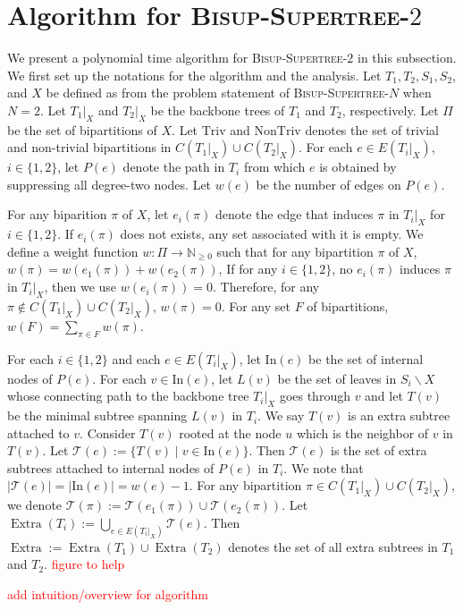 \documentclass{bmcart}
\newcommand{\note}[1]{\textcolor{red}{#1}}
\newcommand{\In}{\mathrm{In}}
\newcommand{\triv}{\mathrm{Triv}}
\newcommand{\ntriv}{\mathrm{NonTriv}}
\newcommand{\bisuptwo}{\textsc{Bisup-Supertree-$2$}\xspace}
\newcommand{\bisupn}{\textsc{Bisup-Supertree-$N$}\xspace}
\DeclareMathOperator*{\extra}{Extra}
\begin{document}
\section{Algorithm for \bisuptwo}
We present a polynomial time algorithm for \bisuptwo in this subsection. We first set up the notations for the algorithm and the analysis. Let $T_1,T_2,S_1,S_2$, and $X$ be defined as from the problem statement of \bisupn when $N = 2$. Let $T_1|_X$ and $T_2|_X$ be the backbone trees of $T_1$ and $T_2$, respectively. Let $\Pi$ be the set of bipartitions of $X$. Let $\triv$ and $\ntriv$ denotes the set of trivial and non-trivial bipartitions in $C(T_1|_X) \cup C(T_2|_X)$. For each $e \in E(T_i|_X)$, $i \in \{1,2\}$, let $P(e)$ denote the path in $T_i$ from which $e$ is obtained by suppressing all degree-two nodes. Let $w(e)$ be the number of edges on $P(e)$. \smallskip

For any biparition $\pi$ of $X$, let $e_i(\pi)$ denote the edge that induces $\pi$ in $T_i|_X$ for $i \in \{1,2\}$. If $e_i(\pi)$ does not exists, any set associated with it is empty. We define a weight function $w:\Pi \to \mathbb{N}_{\ge 0}$ such that for any bipartition $\pi$ of $X$, $w(\pi) = w(e_1(\pi)) + w(e_2(\pi))$, If for any $i \in \{1,2\}$, no $e_i(\pi)$ induces $\pi$ in $T_i|_X$, then we use $w(e_i(\pi)) = 0$. Therefore, for any $\pi \notin C(T_1|_X) \cup C(T_2|_X)$, $w(\pi) = 0$. For any set $F$ of bipartitions, $w(F) = \sum_{\pi \in F} w(\pi)$.\smallskip

For each $i \in \{1,2\}$ and each $e \in E(T_i|_X)$, let $\In(e)$ be the set of internal nodes of $P(e)$. For each $v \in \In(e)$, let $L(v)$ be the set of leaves in $S_i \backslash X$ whose connecting path to the backbone tree $T_i|_X$ goes through $v$ and let $T(v)$ be the minimal subtree spanning $L(v)$ in $T_i$. We say $T(v)$ is an extra subtree attached to $v$. Consider $T(v)$ rooted at the node $u$ which is the neighbor of $v$ in $T(v)$. Let $\mathcal{T}(e) := \{T(v) \mid v \in \In(e)\}$. Then $\mathcal{T}(e)$ is the set of extra subtrees attached to internal nodes of $P(e)$ in $T_i$. We note that $|\mathcal{T}(e)| = |\In(e)| = w(e)-1$. For any bipartition $\pi \in C(T_1|_X) \cup C(T_2|_X)$, we denote $\mathcal{T}(\pi) := \mathcal{T}(e_1(\pi)) \cup \mathcal{T}(e_2(\pi))$. Let $\extra(T_i) := \bigcup_{e \in E(T_i|_X)} \mathcal{T}(e)$. Then $\extra := \extra(T_1) \cup \extra(T_2)$ denotes the set of all extra subtrees in $T_1$ and $T_2$. \note{figure to help}

\note{add intuition/overview for algorithm}
\end{document}
